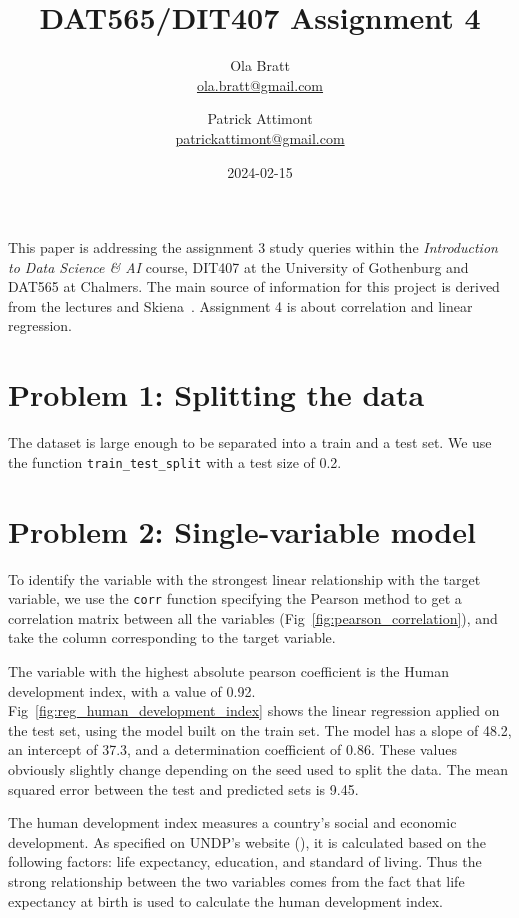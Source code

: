 \documentclass[a4paper]{article}
\begin{document}
\author{Ola Bratt \\
  \href{mailto:ola.bratt@gmail.com}{ola.bratt@gmail.com}
  \and
  Patrick Attimont \\
  \href{patrickattimont@gmail.com}{patrickattimont@gmail.com}
}

\title{DAT565/DIT407 Assignment 4}
\date{2024-02-15}

\maketitle

This paper is addressing the assignment 3 study queries within the \emph{Introduction to Data Science \& AI} course, DIT407 at 
the University of Gothenburg and DAT565 at Chalmers. The main source of information for this project
is derived from the lectures and Skiena~\cite{Skiena:2024}. Assignment 4 is about correlation and linear regression.

\section*{Problem 1: Splitting the data}
The dataset is large enough to be separated into a train and a test set. We use the function \verb|train_test_split| with a test size of 0.2.


\section*{Problem 2: Single-variable model}
To identify the variable with the strongest linear relationship with the target variable, we use the \verb|corr| function specifying the Pearson method to get a correlation matrix between all the variables (Fig~\ref{fig:pearson_correlation}), and take the column corresponding to the target variable.

The variable with the highest absolute pearson coefficient is the Human development index, with a value of 0.92.
Fig~\ref{fig:reg_human_development_index} shows the linear regression applied on the test set, using the model built on the train set.
The model has a slope of 48.2, an intercept of 37.3, and a determination coefficient of 0.86. These values obviously slightly change depending on the seed used to split the data.
The mean squared error between the test and predicted sets is 9.45.

The human development index measures a country's social and economic development. As specified on UNDP's website (\cite{UNDP:2023}), it is calculated based on the following factors: life expectancy, education, and standard of living.
Thus the strong relationship between the two variables comes from the fact that life expectancy at birth is used to calculate the human development index.
\end{document}
